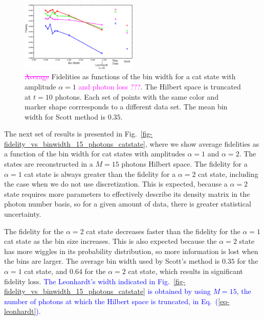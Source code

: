 \documentclass[
reprint,
superscriptaddress,
showpacs,
amsmath,
amssymb,
aps,
pra,
longbibliography
]{revtex4-1}
\providecommand{\aucmnt}[1]{#1}
\providecommand{\editcolor}[2]{\textcolor{#1}{#2}}
\providecommand{\aucmnt}[1]{}
\providecommand{\editcolor}[2]{#2}
\newcommand{\HV}[1]{\editcolor{blue}{#1}}
\newcommand{\SG}[1]{\editcolor{magenta}{#1}}
\newcommand{\SGs}[1]{\aucmnt{\editcolor{magenta}{\sout{#1}}}}
\begin{document}
\begin{figure}
  \includegraphics[width=0.5\textwidth]{methods_fidelity_singledata.eps}
  \caption{\SGs{Average} Fidelities as functions of the bin width for
    a cat state with amplitude $\alpha=1$ \SG{and photon loss
      ???}. The Hilbert space is truncated at $t=10$ photons. Each set
    of points with the same color and marker shape corrresponds to a
    different data set. The mean bin width for Scott method is
    $0.35$.}
  \label{fig-methods_fidelity_singledata}
\end{figure}



The next set of results is presented in
Fig.~\ref{fig-fidelity_vs_binwidth_15_photons_catstate}, where we
show average fidelities as a function of the bin width for cat states 
with amplitudes $\alpha=1$ and $\alpha=2$. The states are reconstructed 
in a $M=15$ photons Hilbert space. The fidelity for a $\alpha=1$ cat state 
is always greater than the fidelity for a $\alpha=2$ cat state, including 
the case when we do not use discretization. This is expected, because a 
$\alpha = 2$ state requires more parameters to effectively describe its 
density matrix in the photon number basis, so for a given amount of data, 
there is greater statistical uncertainty. 

The fidelity for the $\alpha = 2$ cat state decreases faster than the fidelity for the $\alpha=1$ cat state as the bin size increases. This is also expected because the $\alpha = 2$ state has more wiggles in its probability distribution, so more information is lost when the bins are larger. The average bin width used by Scott's 
method is $0.35$ for the $\alpha=1$ cat state, and $0.64$ for the $\alpha=2$ 
cat state, which results in significant fidelity loss. \HV{The Leonhardt's width
indicated in Fig.~\ref{fig-fidelity_vs_binwidth_15_photons_catstate} is obtained 
by using $M=15$, the number of photons at which the Hilbert space is truncated, in Eq.~(\ref{eq-leonhardt}).}
\end{document}
